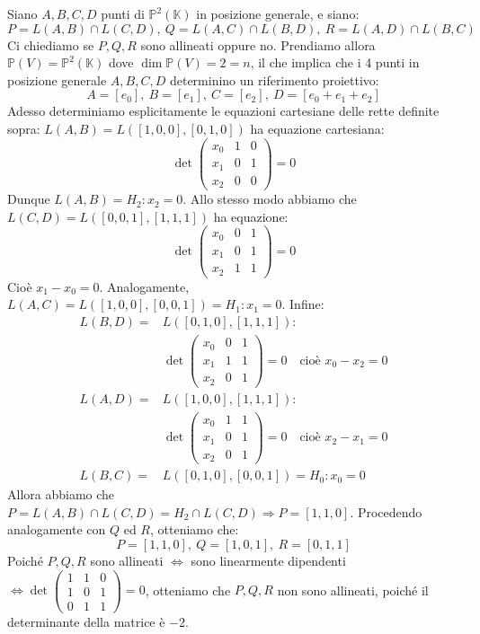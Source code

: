 \begin{ex}
Siano $A,B,C,D$ punti di $\mathbb{P}^2(\mathbb{K})$ in posizione generale, e siano:
$$P=L(A,B) \cap L(C,D),\ Q=L(A,C)\cap L(B,D),\ R=L(A,D)\cap L(B,C)$$
Ci chiediamo se $P,Q,R$ sono allineati oppure no. Prendiamo allora $\mathbb{P}(V)=\mathbb{P}^2(\mathbb{K})$ dove $\dim \mathbb{P}(V)=2=n$, il che implica che i 4 punti in posizione generale $A,B,C,D$ determinino un riferimento proiettivo:
$$A=[e_0],\ B=[e_1],\ C=[e_2],\ D=[e_0+e_1+e_2]$$
Adesso determiniamo esplicitamente le equazioni cartesiane delle rette definite sopra: $L(A,B)=L([1,0,0],[0,1,0])$ ha equazione cartesiana:
$$\det \begin{pmatrix}
x_0 & 1 & 0 \\ x_1 & 0 & 1 \\ x_2 & 0 & 0
\end{pmatrix} =0$$
Dunque $L(A,B)=H_2:x_2=0$. Allo stesso modo abbiamo che $L(C,D)=L([0,0,1],[1,1,1])$ ha equazione:
$$\det \begin{pmatrix}
x_0 & 0 & 1 \\x_1 & 0 & 1 \\ x_2 & 1 & 1
\end{pmatrix}=0$$
Cioè $x_1-x_0=0$. Analogamente, $L(A,C)=L([1,0,0],[0,0,1])=H_1:x_1=0$. Infine:
\begin{align*}
L(B,D)=&L([0,1,0],[1,1,1]):\\
&\det \begin{pmatrix}
x_0 & 0 & 1 \\x_1 & 1& 1 \\ x_2 & 0 & 1
\end{pmatrix}=0 \quad \text{cioè }x_0-x_2=0\\
L(A,D)=&L([1,0,0],[1,1,1]):\\
&\det \begin{pmatrix}
x_0 & 1 & 1 \\x_1 & 0 & 1 \\ x_2 & 0 & 1
\end{pmatrix}=0 \quad \text{cioè }x_2-x_1=0\\
L(B,C)=&L([0,1,0],[0,0,1])=H_0:x_0=0
\end{align*}
Allora abbiamo che $P=L(A,B) \cap L(C,D)=H_2 \cap L(C,D) \Rightarrow P=[1,1,0]$. Procedendo analogamente con $Q$ ed $R$, otteniamo che:
$$P=[1,1,0],\ Q=[1,0,1],\ R=[0,1,1]$$
Poiché $P,Q,R$ sono allineati $\Leftrightarrow$ sono linearmente dipendenti $\Leftrightarrow \det \begin{pmatrix}
1 & 1 & 0 \\ 1 & 0 & 1 \\ 0 & 1 & 1
\end{pmatrix}=0$, otteniamo che $P,Q,R$ non sono allineati, poiché il determinante della matrice è $-2$.
\end{ex}

